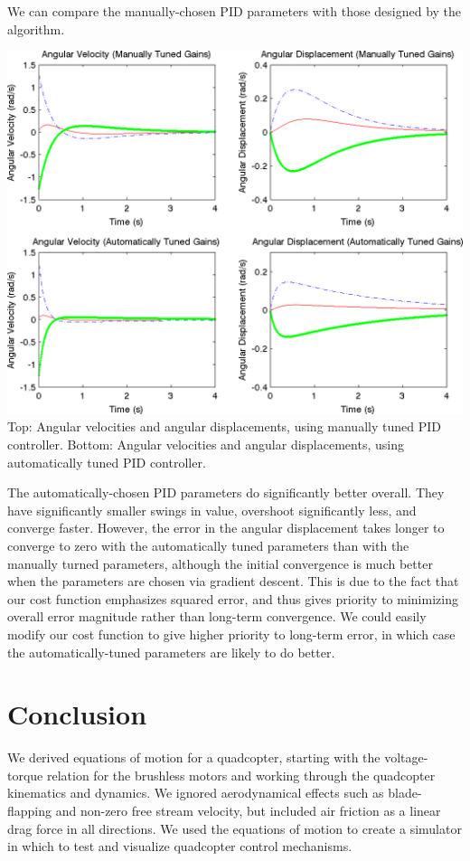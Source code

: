 \documentclass{article}
\begin{document}
We can compare the manually-chosen PID parameters with those designed by the algorithm. 
\begin{center}
    \includegraphics[scale=0.9]{images/pid_gains_comparison.png} \\
    {
        Top: Angular velocities and angular displacements, using manually tuned PID controller.
        Bottom: Angular velocities and angular displacements, using automatically tuned PID
        controller.
    }
\end{center}
The automatically-chosen PID parameters do significantly better overall. They have significantly
smaller swings in value, overshoot significantly less, and converge faster. However, the error in
the angular displacement takes longer to converge to zero with the automatically tuned parameters
than with the manually turned parameters, although the initial convergence is much better when the
parameters are chosen via gradient descent. This is due to the fact that our cost function
emphasizes squared error, and thus gives priority to minimizing overall error magnitude rather than
long-term convergence. We could easily modify our cost function to give higher priority to long-term
error, in which case the automatically-tuned parameters are likely to do better.
\newpage

\section*{Conclusion}
We derived equations of motion for a quadcopter, starting with the voltage-torque relation for the
brushless motors and working through the quadcopter kinematics and dynamics. We ignored
aerodynamical effects such as blade-flapping and non-zero free stream velocity, but included air
friction as a linear drag force in all directions. We used the equations of motion to create a
simulator in which to test and visualize quadcopter control mechanisms.
\end{document}
